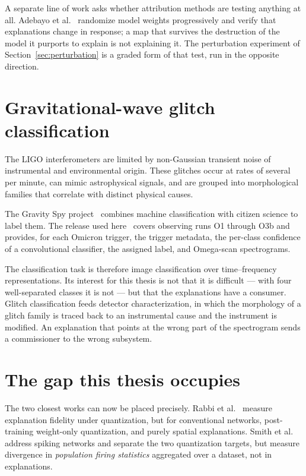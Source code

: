 A separate line of work asks whether attribution methods are testing anything at
all. Adebayo et al.~\cite{adebayo2018sanity} randomize model weights
progressively and verify that explanations change in response; a map that
survives the destruction of the model it purports to explain is not explaining
it. The perturbation experiment of Section~\ref{sec:perturbation} is a graded
form of that test, run in the opposite direction.

\section{Gravitational-wave glitch classification}

The LIGO interferometers are limited by non-Gaussian transient noise of
instrumental and environmental origin. These glitches occur at rates of several
per minute, can mimic astrophysical signals, and are grouped into morphological
families that correlate with distinct physical causes.

The Gravity Spy project~\cite{zevin2017, bahaadini2018} combines machine
classification with citizen science to label them. The release used
here~\cite{glanzer2021} covers observing runs O1 through O3b and provides, for
each Omicron trigger, the trigger metadata, the per-class confidence of a
convolutional classifier, the assigned label, and Omega-scan spectrograms.

The classification task is therefore image classification over time--frequency
representations. Its interest for this thesis is not that it is difficult ---
with four well-separated classes it is not --- but that the explanations have a
consumer. Glitch classification feeds detector characterization, in which the
morphology of a glitch family is traced back to an instrumental cause and the
instrument is modified. An explanation that points at the wrong part of the
spectrogram sends a commissioner to the wrong subsystem.

\section{The gap this thesis occupies}

The two closest works can now be placed precisely. Rabbi et
al.~\cite{rabbi2026} measure explanation fidelity under quantization, but for
conventional networks, post-training weight-only quantization, and purely
spatial explanations. Smith et al.~\cite{smith2026} address spiking networks and
separate the two quantization targets, but measure divergence in \emph{population
firing statistics} aggregated over a dataset, not in explanations.


